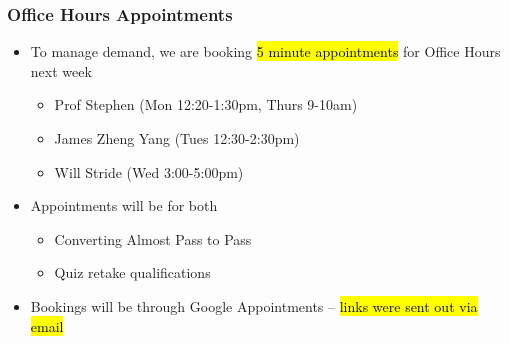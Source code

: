 \begin{frame}
    \frametitle{Office Hours Appointments}
    \begin{itemize}
        \item To manage demand, we are booking \hl{5 minute appointments} for Office Hours next week
        \begin{itemize}
            \item Prof Stephen (Mon 12:20-1:30pm, Thurs 9-10am)
            \item James Zheng Yang (Tues 12:30-2:30pm)
            \item Will Stride (Wed 3:00-5:00pm)
        \end{itemize}
        \item Appointments will be for both
        \begin{itemize}
            \item Converting Almost Pass to Pass
            \item Quiz retake qualifications
        \end{itemize}
        \item Bookings will be through Google Appointments -- \hl{links were sent out via email}
    \end{itemize}
\end{frame}


